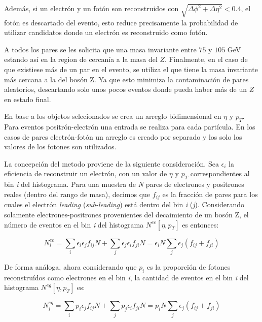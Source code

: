 Además, si un electrón y un fotón son reconstruidos con $\sqrt{\Delta\phi^{2}+\Delta\eta^{2}}<0.4$, el fotón es descartado del evento, esto reduce precisamente la probabilidad de utilizar candidatos donde un electrón es reconstruido como fotón. 

A todos los pares se les solicita que una masa invariante entre $75$ y $105$ GeV  estando así en la region de cercanía a la masa del $Z$. Finalmente, en el caso de que existiese más de un par en el evento, se utiliza el que tiene la masa invariante más cercana a la del bosón Z. Ya que esto minimiza la contaminación de pares aleatorios, descartando solo unos pocos eventos donde pueda haber más de un $Z$ en estado final.


En base a los objetos selecionados se crea un arreglo bidimensional en  $\eta$ y $p_{T}$. Para eventos positrón-electrón una entrada se realiza para cada partícula. En los casos de pares electrón-fotón un arreglo es creado por separado y los solo los valores de los fotones son utilizados.

La concepción del metodo proviene de la siguiente consideración. Sea $\epsilon_{i}$ la eficiencia de reconstruir un electrón, con un valor de $\eta$ y $p_{T}$ correspondientes al bin \textit{i} del histograma. Para una muestra de \textit{N} pares de electrones y positrones reales (dentro del rango de masa), decimos que $f_{ij}$ es la fracción de pares para los cuales el electrón \textit{leading} (\textit{sub-leading}) está dentro del bin \textit{i} (\textit{j}). Considerando solamente electrones-positrones provenientes del decaimiento de un bosón Z, el número de eventos en el bin \textit{i} del histograma $N^{ee}[\eta , p_{T}]$ es entonces:

\begin{equation}
N_{i}^{ee} = \sum_{i}\epsilon_{i}\epsilon_{j}f_{ij}N + \sum_{j}\epsilon_{j}\epsilon_{i}f_{ji}N = \epsilon_{i}N\sum_{j}\epsilon_{j}(f_{ij}+f_{ji})
\end{equation}

De forma análoga, ahora considerando que $p_{i}$ es la proporción de fotones reconstruídos como electrones en el bin \textit{i}, la cantidad de eventos en el bin \textit{i} del histograma $N^{eg}[\eta , p_{T}]$ es:

\begin{equation}
N_{i}^{eg} = \sum_{i}p_{i}\epsilon_{j}f_{ij}N + \sum_{j}p_{j}\epsilon_{i}f_{ji}N = p_{i}N\sum_{j}\epsilon_{j}(f_{ij}+f_{ji})
\end{equation}

